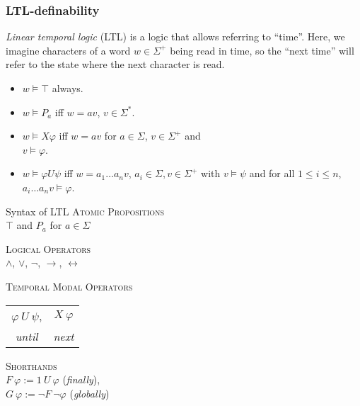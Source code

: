 \documentclass[english]{panikzettel}
\begin{document}

\subsubsection{LTL-definability}
\label{sssec:ltl}
\begin{halfboxl}
    \emph{Linear temporal logic} (LTL) is a logic that allows referring to ``time''.
    Here, we imagine characters of a word $w \in \Sigma^+$ being read in time, so the ``next time'' will refer to the state where the next character is read.

    \begin{itemize}[leftmargin=*]
        \item $w \models \top$ always.
        \item $w \models P_a$ iff $w = av$, $v \in \Sigma^\ast$.
        \item $w \models X\varphi$ iff $w = av$ for $a \in \Sigma$, $v \in \Sigma^+$ and \\
                $v \models \varphi$.
        \item $w \models \varphi U \psi$ iff $w = a_1\ldots a_n v$, $a_i \in \Sigma, v \in \Sigma^+$ with $v \models \psi$ and for all $1 \le i \le n$, $a_i\ldots a_n v \models \varphi$.
    \end{itemize}
\end{halfboxl}%
\begin{halfboxr}
    \vspace{-\baselineskip}
    \begin{defi}{Syntax of LTL}
        \centering
        \textsc{Atomic Propositions} \\
        $\top$ and $P_a$ for $a \in \Sigma$

        \textsc{Logical Operators} \\
        $\land$, $\lor$, $\neg$, $\rightarrow$, $\leftrightarrow$

        \textsc{Temporal Modal Operators} \\
        \begin{tabular}{cc}
            $\varphi ~U~ \psi$, & $X~\varphi$ \\
            \emph{until} & \emph{next}
        \end{tabular}

        \textsc{Shorthands} \\
        $F~\varphi := 1~U~\varphi$ (\emph{finally}), \\
        $G~\varphi := \neg F~ \neg \varphi$ (\emph{globally})
    \end{defi}
\end{halfboxr}
\end{document}
